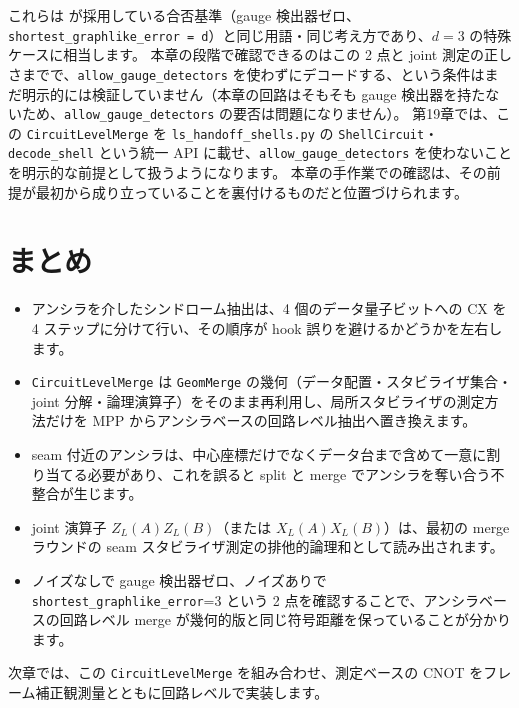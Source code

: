 これらは  が採用している合否基準（gauge 検出器ゼロ、\texttt{shortest\_graphlike\_error = d}）と同じ用語・同じ考え方であり、$d=3$ の特殊ケースに相当します。
本章の段階で確認できるのはこの 2 点と joint 測定の正しさまでで、\texttt{allow\_gauge\_detectors} を使わずにデコードする、という条件はまだ明示的には検証していません（本章の回路はそもそも gauge 検出器を持たないため、\texttt{allow\_gauge\_detectors} の要否は問題になりません）。
第19章では、この \texttt{CircuitLevelMerge} を \texttt{ls\_handoff\_shells.py} の \texttt{ShellCircuit}・\texttt{decode\_shell} という統一 API に載せ、\texttt{allow\_gauge\_detectors} を使わないことを明示的な前提として扱うようになります。
本章の手作業での確認は、その前提が最初から成り立っていることを裏付けるものだと位置づけられます。

\section{まとめ}\label{ch15:summary}

\begin{itemize}
  \item アンシラを介したシンドローム抽出は、4 個のデータ量子ビットへの CX を 4 ステップに分けて行い、その順序が hook 誤りを避けるかどうかを左右します。
  \item \texttt{CircuitLevelMerge} は \texttt{GeomMerge} の幾何（データ配置・スタビライザ集合・joint 分解・論理演算子）をそのまま再利用し、局所スタビライザの測定方法だけを MPP からアンシラベースの回路レベル抽出へ置き換えます。
  \item seam 付近のアンシラは、中心座標だけでなくデータ台まで含めて一意に割り当てる必要があり、これを誤ると split と merge でアンシラを奪い合う不整合が生じます。
  \item joint 演算子 $Z_L(A)Z_L(B)$（または $X_L(A)X_L(B)$）は、最初の merge ラウンドの seam スタビライザ測定の排他的論理和として読み出されます。
  \item ノイズなしで gauge 検出器ゼロ、ノイズありで \texttt{shortest\_graphlike\_error}=3 という 2 点を確認することで、アンシラベースの回路レベル merge が幾何的版と同じ符号距離を保っていることが分かります。
\end{itemize}

次章では、この \texttt{CircuitLevelMerge} を組み合わせ、測定ベースの CNOT をフレーム補正観測量とともに回路レベルで実装します。

